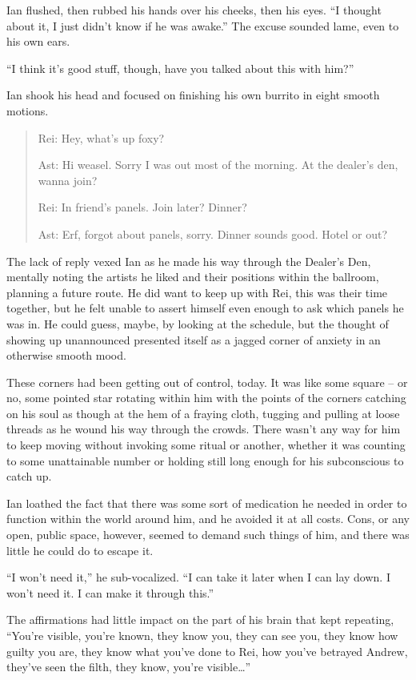 Ian flushed, then rubbed his hands over his cheeks, then his eyes. ``I thought about it, I just didn't know if he was awake.'' The excuse sounded lame, even to his own ears.

``I think it's good stuff, though, have you talked about this with him?''

Ian shook his head and focused on finishing his own burrito in eight smooth motions.

\secdiv{}

\begin{quote}
Rei: Hey, what's up foxy?

Ast: Hi weasel. Sorry I was out most of the morning. At the dealer's den, wanna join?

Rei: In friend's panels. Join later? Dinner?

Ast: Erf, forgot about panels, sorry. Dinner sounds good. Hotel or out?
\end{quote}

The lack of reply vexed Ian as he made his way through the Dealer's Den, mentally noting the artists he liked and their positions within the ballroom, planning a future route. He did want to keep up with Rei, this was their time together, but he felt unable to assert himself even enough to ask which panels he was in. He could guess, maybe, by looking at the schedule, but the thought of showing up unannounced presented itself as a jagged corner of anxiety in an otherwise smooth mood.

These corners had been getting out of control, today. It was like some square -- or no, some pointed star rotating within him with the points of the corners catching on his soul as though at the hem of a fraying cloth, tugging and pulling at loose threads as he wound his way through the crowds. There wasn't any way for him to keep moving without invoking some ritual or another, whether it was counting to some unattainable number or holding still long enough for his subconscious to catch up.

Ian loathed the fact that there was some sort of medication he needed in order to function within the world around him, and he avoided it at all costs. Cons, or any open, public space, however, seemed to demand such things of him, and there was little he could do to escape it.

``I won't need it,'' he sub-vocalized. ``I can take it later when I can lay down. I won't need it. I can make it through this.''

The affirmations had little impact on the part of his brain that kept repeating, ``You're visible, you're known, they know you, they can see you, they know how guilty you are, they know what you've done to Rei, how you've betrayed Andrew, they've seen the filth, they know, you're visible\ldots{}''

